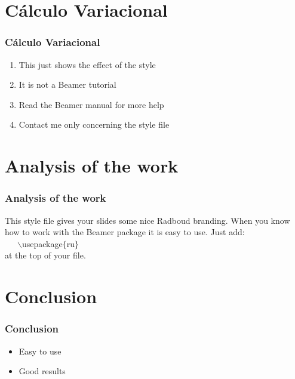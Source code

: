 \documentclass{beamer}
\begin{document}
\section{Cálculo Variacional}

\begin{frame}
  \frametitle{Cálculo Variacional}

  \begin{enumerate}
    \item This just shows the effect of the style
    \item It is not a Beamer tutorial
    \item Read the Beamer manual for more help
    \item Contact me only concerning the style file
  \end{enumerate}
\end{frame}

\section{Analysis of the work}

\begin{frame}
  \frametitle{Analysis of the work}

  This style file gives your slides some nice Radboud branding.
  When you know how to work with the Beamer package it is easy to use.
  Just add:\\ ~~~$\backslash$usepackage$\{$ru$\}$ \\ at the top of your file.
\end{frame}

\section{Conclusion}

\begin{frame}
  \frametitle{Conclusion}

  \begin{itemize}
    \item Easy to use
    \item Good results
  \end{itemize}
\end{frame}
\end{document}
